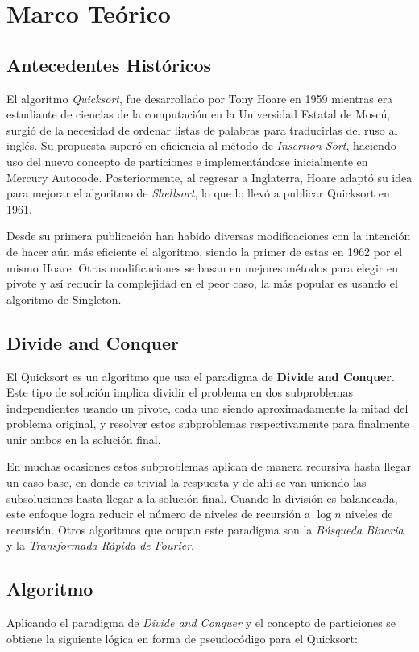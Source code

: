 \documentclass[conference]{IEEEtran}
\begin{document}
\section{Marco Teórico}
\subsection{Antecedentes Históricos}
El algoritmo \textit{Quicksort}, fue desarrollado por Tony Hoare en 1959 mientras era estudiante de ciencias de la computación en la Universidad Estatal de Moscú, 
surgió de la necesidad de ordenar listas de palabras para traducirlas del ruso al inglés. 
Su propuesta superó en eficiencia al método de \textit{Insertion Sort}, haciendo uso del nuevo concepto de particiones e implementándose inicialmente en Mercury Autocode. 
Posteriormente, al regresar a Inglaterra, Hoare adaptó su idea para mejorar el algoritmo de \textit{Shellsort}, lo que lo llevó a publicar Quicksort en 1961.\cite{original_paper}
\par
Desde su primera publicación han habido diversas modificaciones con la intención de hacer aún más eficiente el algoritmo, siendo la primer de estas en 1962 por el mismo Hoare.
Otras modificaciones se basan en mejores métodos para elegir en pivote y así reducir la complejidad en el peor caso, la más popular es usando el algoritmo de Singleton.\cite{history} 

\subsection{Divide and Conquer}
El Quicksort es un algoritmo que usa el paradigma de \textbf{Divide and Conquer}\cite{divide_and_conquer}. 
Este tipo de solución implica dividir el problema en dos subproblemas independientes usando un pivote, 
cada uno siendo aproximadamente la mitad del problema original, y resolver estos subproblemas respectivamente para finalmente unir ambos en la solución final.\par
En muchas ocasiones estos subproblemas aplican de manera recursiva hasta llegar un caso base, en donde es trivial la respuesta y de ahí se van uniendo las subsoluciones hasta llegar a la solución final.
Cuando la división es balanceada, este enfoque logra reducir el número de niveles de recursión a $\log{n}$ niveles de recursión.
Otros algoritmos que ocupan este paradigma son la \textit{Búsqueda Binaria} y la \textit{Transformada Rápida de Fourier}.


\subsection{Algoritmo}
Aplicando el paradigma de \textit{Divide and Conquer} y el concepto de particiones se obtiene la siguiente lógica en forma de pseudocódigo para el Quicksort\cite{Grokking}:
\end{document}
